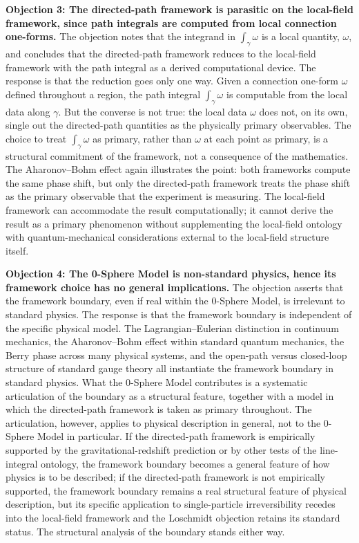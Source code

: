 \documentclass[%
 reprint, amsmath,amssymb, aps, prb, ]{revtex4-2}
\numberwithin{equation}{section}
\begin{document}
\textbf{Objection 3: The directed-path framework is parasitic on the local-field framework, since path integrals are computed from local connection one-forms.} The objection notes that the integrand in $\int_\gamma \omega$ is a local quantity, $\omega$, and concludes that the directed-path framework reduces to the local-field framework with the path integral as a derived computational device. The response is that the reduction goes only one way. Given a connection one-form $\omega$ defined throughout a region, the path integral $\int_\gamma \omega$ is computable from the local data along $\gamma$. But the converse is not true: the local data $\omega$ does not, on its own, single out the directed-path quantities as the physically primary observables. The choice to treat $\int_\gamma \omega$ as primary, rather than $\omega$ at each point as primary, is a structural commitment of the framework, not a consequence of the mathematics. The Aharonov--Bohm effect again illustrates the point: both frameworks compute the same phase shift, but only the directed-path framework treats the phase shift as the primary observable that the experiment is measuring. The local-field framework can accommodate the result computationally; it cannot derive the result as a primary phenomenon without supplementing the local-field ontology with quantum-mechanical considerations external to the local-field structure itself.

\textbf{Objection 4: The 0-Sphere Model is non-standard physics, hence its framework choice has no general implications.} The objection asserts that the framework boundary, even if real within the 0-Sphere Model, is irrelevant to standard physics. The response is that the framework boundary is independent of the specific physical model. The Lagrangian--Eulerian distinction in continuum mechanics, the Aharonov--Bohm effect within standard quantum mechanics, the Berry phase across many physical systems, and the open-path versus closed-loop structure of standard gauge theory all instantiate the framework boundary in standard physics. What the 0-Sphere Model contributes is a systematic articulation of the boundary as a structural feature, together with a model in which the directed-path framework is taken as primary throughout. The articulation, however, applies to physical description in general, not to the 0-Sphere Model in particular. If the directed-path framework is empirically supported by the gravitational-redshift prediction or by other tests of the line-integral ontology, the framework boundary becomes a general feature of how physics is to be described; if the directed-path framework is not empirically supported, the framework boundary remains a real structural feature of physical description, but its specific application to single-particle irreversibility recedes into the local-field framework and the Loschmidt objection retains its standard status. The structural analysis of the boundary stands either way.
\end{document}
